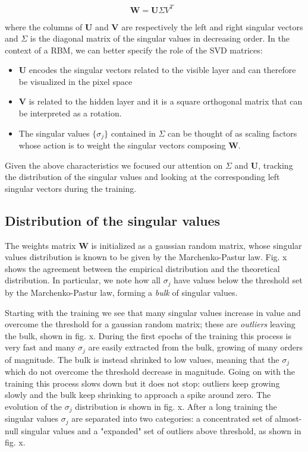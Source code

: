 \documentclass[twocolumn]{article}
\begin{document}
\begin{equation}
\textbf{W} = \textbf{U\(\Sigma V^T \) } 
\end{equation}

where the columns of \textbf{U} and \textbf{V} are respectively the left and right singular vectors and \textbf{\(\Sigma\)} is the diagonal matrix of the singular values in decreasing order. 
In the context of a RBM, we can better specify the role of the SVD matrices:

\begin{itemize}
\item \textbf{U} encodes the singular vectors related to the visible layer and can therefore be visualized in the pixel space
\item  \textbf{V} is related to the hidden layer and it is a square orthogonal matrix that can be interpreted as a rotation. 
\item The singular values \( \{ {\sigma}_j \} \) contained in \textbf{\(\Sigma\)} can be thought of as scaling factors whose action is to weight the singular vectors composing \textbf{W}.
\end{itemize}

Given the above characteristics we focused our attention on \textbf{\(\Sigma\)} and \textbf{U}, tracking the distribution of the singular values and looking at the corresponding left singular vectors during the training.

\subsection{Distribution of the singular values}
The weights matrix \(\textbf{W}\) is initialized as a gaussian random matrix, whose singular values distribution is known to be given by the Marchenko-Pastur law. Fig. x shows the agreement between the empirical distribution and the theoretical distribution. In particular, we note how all \(\sigma_j\) have values below the threshold set by the Marchenko-Pastur law, forming a \textit{bulk} of singular values.

Starting with the training we see that many singular values increase in value and overcome the threshold for a gaussian random matrix; these are \textit{outliers} leaving the bulk, shown in fig. x. During the first epochs of the training this process is very fast and many \(\sigma_j\) are easily extracted from the bulk, growing of many orders of magnitude. The bulk is instead shrinked to low values, meaning that the \(\sigma_j\) which do not overcome the threshold decrease in magnitude. Going on with the training this process slows down but it does not stop: outliers keep growing slowly and the bulk keep shrinking to approach a spike around zero. The evolution of the \(\sigma_j\) distribution is shown in fig. x. After a long training the singular values \(\sigma_j\) are separated into two categories: a concentrated set of almost-null singular values and a "expanded" set of outliers above threshold, as shown in fig. x. 
\end{document}
